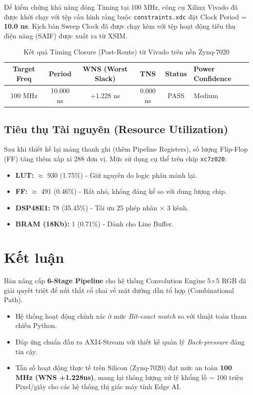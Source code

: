 \documentclass[a4paper,12pt]{article}
\begin{document}
Để kiểm chứng khả năng đóng Timing tại 100 MHz, công cụ Xilinx Vivado đã được khởi chạy với tệp cấu hình ràng buộc \texttt{constraints.xdc} đặt Clock Period = \textbf{10.0 ns}. Kịch bản Sweep Clock đã được chạy kèm với tệp hoạt động tiêu thụ điện năng (SAIF) được xuất ra từ XSIM.

\begin{table}[H]
    \centering
    \begin{tabularx}{\textwidth}{|c|c|c|c|c|X|}
    \hline
    \textbf{Target Freq} & \textbf{Period} & \textbf{WNS (Worst Slack)} & \textbf{TNS} & \textbf{Status} & \textbf{Power Confidence} \\ \hline
    100 MHz & 10.000 ns & +1.228 ns & 0.000 ns & \textcolor{green!70!black}{PASS} & Medium \\ \hline
    \end{tabularx}
    \caption{Kết quả Timing Closure (Post-Route) từ Vivado trên nền Zynq-7020}
\end{table}

\subsection{Tiêu thụ Tài nguyên (Resource Utilization)}
Sau khi thiết kế lại mảng thanh ghi (thêm Pipeline Registers), số lượng Flip-Flop (FF) tăng thêm xấp xỉ 288 đơn vị. Mức sử dụng cụ thể trên chip \texttt{xc7z020}:
\begin{itemize}
    \item \textbf{LUT:} $\approx$ 930 (1.75\%) - Giữ nguyên do logic phân mảnh lại.
    \item \textbf{FF:} $\approx$ 491 (0.46\%) - Rất nhỏ, không đáng kể so với dung lượng chip.
    \item \textbf{DSP48E1:} 78 (35.45\%) - Tối ưu 25 phép nhân $\times$ 3 kênh.
    \item \textbf{BRAM (18Kb):} 1 (0.71\%) - Dành cho Line Buffer.
\end{itemize}

\section{Kết luận}
Bản nâng cấp \textbf{6-Stage Pipeline} cho hệ thống Convolution Engine 5$\times$5 RGB đã giải quyết triệt để nút thắt cổ chai về mặt đường dẫn tổ hợp (Combinational Path). 
\begin{itemize}
    \item Hệ thống hoạt động chính xác ở mức \textit{Bit-exact match} so với thuật toán tham chiếu Python.
    \item Đáp ứng chuẩn đầu ra AXI4-Stream với thiết kế quản lý \textit{Back-pressure} đáng tin cậy.
    \item Tần số hoạt động thực tế trên Silicon (Zynq-7020) đạt mức an toàn \textbf{100 MHz (WNS +1.228ns)}, mang lại thông lượng xử lý khổng lồ $\sim$ 100 triệu Pixel/giây cho các hệ thống thị giác máy tính Edge AI.
\end{itemize}
\end{document}
